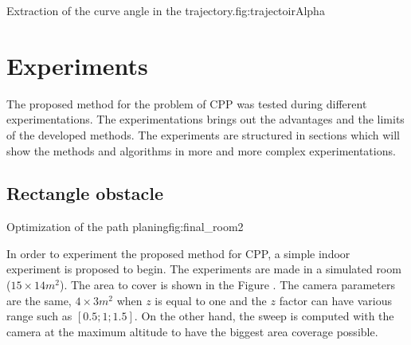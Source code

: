  \begin{mfigures}[!]{Extraction of the curve angle in the trajectory.}{fig:trajectoirAlpha} \centering
{}
\end{mfigures} 
	
	
				



			\section{Experiments} \label{sec:experiment}
			
The proposed method for the problem of CPP was tested during different experimentations. The experimentations brings out the advantages and the limits of the developed methods. The experiments are structured in sections which will show the methods and algorithms in more and more complex experimentations.

\subsection{Rectangle obstacle} \label{experiment}

 \begin{mfigures}[!]{Optimization of the path planing}{fig:final_room2} \centering
\hspace{1cm}

\tabsVrepPath
\end{mfigures} 

In order to experiment the proposed method for CPP, a simple indoor experiment is proposed to begin.
The experiments are made in a simulated room ($15 \times 14 m^2$). The area to cover is shown in the Figure . The camera parameters are the same, $4 \times 3 m^2$ when $z$ is equal to one and the $z$ factor can have various range such as $[0.5;1;1.5]$. On the other hand, the sweep is computed with the camera at the maximum altitude to have the biggest area coverage possible.

